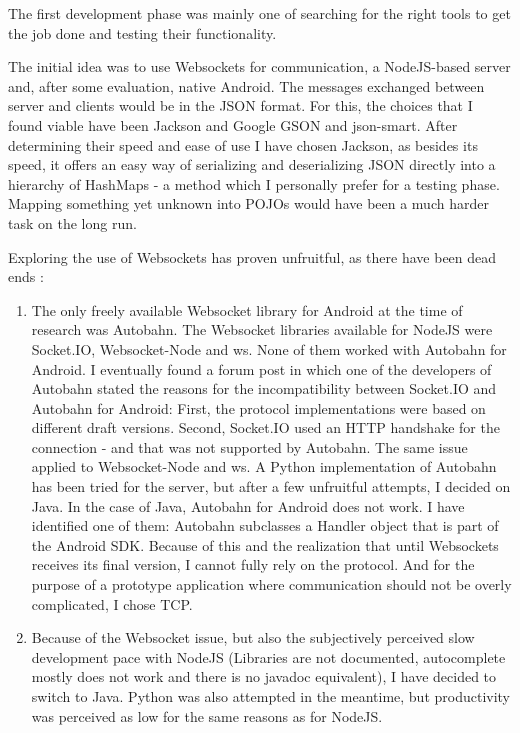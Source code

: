 \documentclass{article}
\begin{document}
The first development phase was mainly one of searching for the right tools to
get the job done and testing their functionality.\newline

The initial idea was to use Websockets for communication, a NodeJS-based server
and, after some evaluation, native Android. The messages exchanged between
server and clients would be in the JSON format. For this, the choices that I
found viable have been Jackson and Google GSON and json-smart. After determining
their speed and ease of use I have chosen Jackson, as besides its speed, it
offers an easy way of serializing and deserializing JSON directly into a
hierarchy of HashMaps - a method which I personally prefer for a testing phase.
Mapping something yet unknown into POJOs would have been a much harder task on
the long run.\newline

Exploring the use of Websockets has proven unfruitful, as there have been dead
ends :
\begin{enumerate}
  \item The only freely available Websocket library for Android at the time of
  research was Autobahn. The Websocket libraries available for NodeJS were
  Socket.IO, Websocket-Node and ws. None of them worked with Autobahn for
  Android. I eventually found a forum post in which one of the developers of
  Autobahn stated the reasons for the incompatibility between Socket.IO and
  Autobahn for Android: First, the protocol implementations were based on
  different draft versions. Second, Socket.IO used an HTTP handshake for the
  connection - and that was not supported by Autobahn. The same issue applied to
  Websocket-Node and ws. A Python implementation of Autobahn has been tried for
  the server, but after a few unfruitful attempts, I decided on Java. In the
  case of Java, Autobahn for Android does not work. I have identified one of
  them: Autobahn subclasses a Handler object that is part of the Android SDK.
  Because of this and the realization that until Websockets receives its final
  version, I cannot fully rely on the protocol. And for the purpose of a
  prototype application where communication should not be overly complicated, I
  chose TCP.
  
  \item Because of the Websocket issue, but also the subjectively perceived slow
  development pace with NodeJS (Libraries are not documented, autocomplete
  mostly does not work and there is no javadoc equivalent), I have decided to
  switch to Java. Python was also attempted in the meantime, but productivity
  was perceived as low for the same reasons as for NodeJS.  
\end{enumerate}
\end{document}
